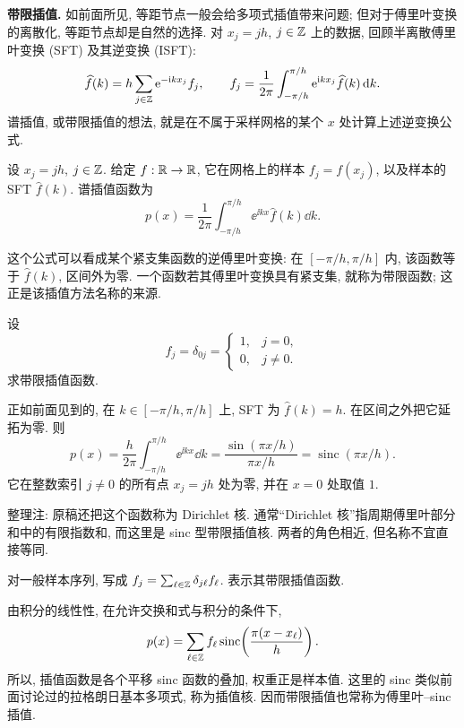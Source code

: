 \label{chap:spectral}

\label{sec:spectral-interpolation}
\textbf{带限插值.} 如前面所见, 等距节点一般会给多项式插值带来问题; 但对于傅里叶变换的离散化, 等距节点却是自然的选择. 对 $x_j=jh$, $j\in\mathbb Z$ 上的数据, 回顾半离散傅里叶变换 (SFT) 及其逆变换 (ISFT):
\[
\widehat f(k)=h\sum_{j\in\mathbb Z}\mathrm e^{-\mathrm i kx_j}f_j,
\qquad
f_j=\frac1{2\pi}\int_{-\pi/h}^{\pi/h}\mathrm e^{\mathrm i kx_j}\widehat f(k)\,\mathrm d k.
\]
谱插值, 或带限插值的想法, 就是在不属于采样网格的某个 $x$ 处计算上述逆变换公式.

\begin{definition}\label{def:bandlimited-interpolant}
设 $x_j=jh$, $j\in\mathbb Z$. 给定 $f:\mathbb R\to\mathbb R$, 它在网格上的样本 $f_j=f(x_j)$, 以及样本的 SFT $\widehat f(k)$. 谱插值函数为
\[
p(x)=\frac1{2\pi}\int_{-\pi/h}^{\pi/h}\ee^{\ii kx}\widehat f(k)\dd k.
\]
\end{definition}

这个公式可以看成某个紧支集函数的逆傅里叶变换: 在 $[-\pi/h,\pi/h]$ 内, 该函数等于 $\widehat f(k)$, 区间外为零. 一个函数若其傅里叶变换具有紧支集, 就称为带限函数; 这正是该插值方法名称的来源.

\begin{example}\label{ex:sinc-interpolation-kernel}
设
\[
f_j=\delta_{0j}=\begin{cases}1,&j=0,\\0,&j\ne0.\end{cases}
\]
求带限插值函数.
\end{example}
\begin{solution}
正如前面见到的, 在 $k\in[-\pi/h,\pi/h]$ 上, SFT 为 $\widehat f(k)=h$. 在区间之外把它延拓为零. 则
\[
p(x)=\frac h{2\pi}\int_{-\pi/h}^{\pi/h}\ee^{\ii kx}\dd k
=\frac{\sin(\pi x/h)}{\pi x/h}
=\operatorname{sinc}(\pi x/h).
\]
它在整数索引 $j\ne0$ 的所有点 $x_j=jh$ 处为零, 并在 $x=0$ 处取值 $1$.
\end{solution}
\begin{remark}
整理注: 原稿还把这个函数称为 Dirichlet 核. 通常“Dirichlet 核”指周期傅里叶部分和中的有限指数和, 而这里是 sinc 型带限插值核. 两者的角色相近, 但名称不宜直接等同.
\end{remark}

\begin{example}\label{ex:sinc-superposition}
对一般样本序列, 写成 $f_j=\sum_{\ell\in\mathbb Z}\delta_{j\ell}f_\ell$. 表示其带限插值函数.
\end{example}
\begin{solution}
由积分的线性性, 在允许交换和式与积分的条件下,
\[
p(x)=\sum_{\ell\in\mathbb Z}f_\ell
\operatorname{sinc}\!\left(\frac{\pi(x-x_\ell)}h\right).
\]
所以, 插值函数是各个平移 sinc 函数的叠加, 权重正是样本值. 这里的 sinc 类似前面讨论过的拉格朗日基本多项式, 称为插值核. 因而带限插值也常称为傅里叶--sinc 插值.
\end{solution}

